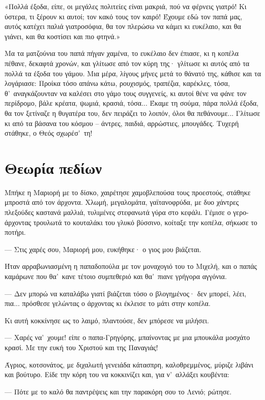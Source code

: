 \documentclass[diploma]{softlab-thesis}
\begin{document}
«Πολλά έξοδα, είπε, οι μεγάλες πολιτείες είναι μακριά, πού να φέρνεις
γιατρό! Κι ύστερα, τι ξέρουν κι αυτοί; τον κακό τους τον καιρό! Έχουμε εδώ
τον παπά μας, αυτός κατέχει παλιά γιατροσόφια, θα τον πλερώσω να κάμει κι
ευκέλαιο, και θα γιάνει, και θα κοστίσει και πιο φτηνά.»

Μα τα ματζούνια του παπά πήγαν χαμένα, το ευκέλαιο δεν έπιασε, κι η κοπέλα
πέθανε, δεκαφτά χρονών, και γλίτωσε από τον κύρη της· γλίτωσε κι αυτός από
τα πολλά τα έξοδα του γάμου. Μια μέρα, λίγους μήνες μετά το θάνατό της,
κάθισε και τα λογάριασε: Προίκα τόσο απάνω κάτω, ρουχισμός, τραπέζια,
καρέκλες, τόσα, θ’~αναγκάζουνταν να καλέσει στο γάμο τους συγγενείς, κι
αυτοί θένε να φάνε τον περίδρομο, βάλε κρέατα, ψωμιά, κρασιά, τόσα... Έκαμε
τη σούμα, πάρα πολλά έξοδα, θα τον ξετίναζε η θυγατέρα του, δεν πειράζει το
λοιπόν, όλοι θα πεθάνουμε... Γλίτωσε κι από τα βάσανα του κόσμου – άντρες,
παιδιά, αρρώστιες, μπουγάδες. Τυχερή στάθηκε, ο Θεός σχωρέσ’~τη!


\section{Θεωρία πεδίων}

Μπήκε η Μαριορή με το δίσκο, χαιρέτησε χαμοβλεπούσα τους προεστούς, στάθηκε
μπροστά από τον άρχοντα. Χλωμή, μεγαλομάτα, γαϊτανοφρύδα, με δυο χάντρες
πλεξούδες καστανά μαλλιά, τυλιμένες στεφανωτά γύρα στο κεφάλι. Γέμισε ο
γερο-άρχοντας τρουλωτά το κουταλάκι του γλυκό βύσσινο, κοίταξε την κοπέλα,
σήκωσε το ποτήρι.

--- Στις χαρές σου, Μαριορή μου, ευκήθηκε· ο γιος μου βιάζεται.

Ήταν αρραβωνιασμένη η παπαδοπούλα με τον μοναχογιό του το Μιχελή, και ο
παπάς καμάρωνε που θα’~κανε τέτοιο συμπεθεριό και θα’~πιανε γρήγορα αγγόνια.

--- Δεν μπορώ να καταλάβω γιατί βιάζεται τόσο ο βλογημένος· δεν μπορεί,
λέει, πια... πρόσθεσε γελώντας ο άρχοντας κι έκλεισε το μάτι στην κοπέλα.

Κι αυτή κοκκίνησε ως το λαιμό, πλαντούσε, δεν μπόρεσε να μιλήσει.

--- Χαρές να’~χουμε! είπε ο παπα-Γρηγόρης, μπαίνοντας με μια μπουκάλα
μοσχάτο κρασί. Με την ευκή του Χριστού και της Παναγιάς!

Άγριος, κοτσονάτος, με διχαλωτή γενειάδα κάτασπρη, καλοθρεμμένος, μύριζε
λιβάνι και βούτυρο. Είδε την κόρη του να κοκκινίζει και, για ν’~αλλάξει
κουβέντα:

--- Πότε με το καλό θα παντρέψεις και την παρακόρη σου το Λενιό; ρώτησε.
\end{document}
